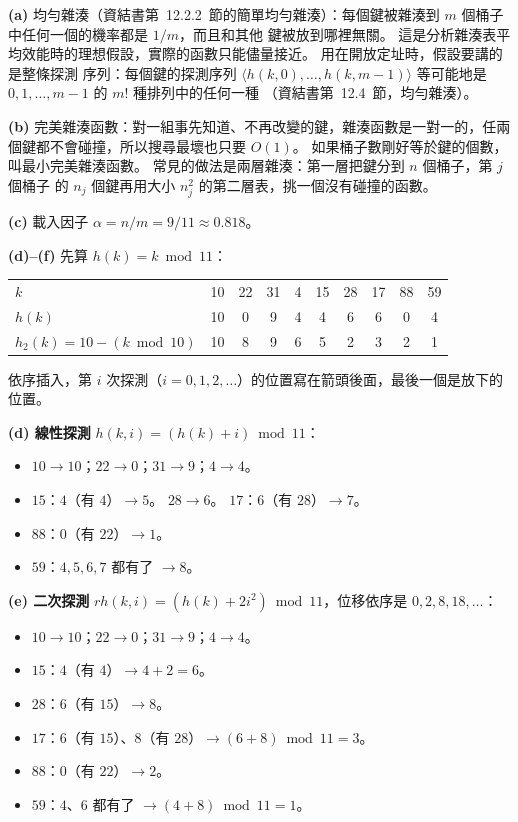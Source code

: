 \begin{pastsoln}
\textbf{(a)} 均勻雜湊（資結書第~12.2.2~節的簡單均勻雜湊）：每個鍵被雜湊到 $m$ 個桶子中任何一個的機率都是 $1/m$，而且和其他
鍵被放到哪裡無關。 這是分析雜湊表平均效能時的理想假設，實際的函數只能儘量接近。 用在開放定址時，假設要講的是整條探測
序列：每個鍵的探測序列 $\langle h(k,0), \ldots, h(k,m-1)\rangle$ 等可能地是 $0, 1, \ldots, m-1$ 的 $m!$ 種排列中的任何一種
（資結書第~12.4~節，均勻雜湊）。

\textbf{(b)} 完美雜湊函數：對一組事先知道、不再改變的鍵，雜湊函數是一對一的，任兩個鍵都不會碰撞，所以搜尋最壞也只要
$O(1)$。 如果桶子數剛好等於鍵的個數，叫最小完美雜湊函數。 常見的做法是兩層雜湊：第一層把鍵分到 $n$ 個桶子，第 $j$ 個桶子
的 $n_j$ 個鍵再用大小 $n_j^2$ 的第二層表，挑一個沒有碰撞的函數。

\textbf{(c)} 載入因子 $\alpha = n/m = 9/11 \approx 0.818$。

\textbf{(d)--(f)} 先算 $h(k) = k \bmod 11$：
\begin{center}
\small
\begin{tabular}{l*{9}{c}}
\toprule
$k$ & 10 & 22 & 31 & 4 & 15 & 28 & 17 & 88 & 59 \\
$h(k)$ & 10 & 0 & 9 & 4 & 4 & 6 & 6 & 0 & 4 \\
$h_2(k) = 10 - (k \bmod 10)$ & 10 & 8 & 9 & 6 & 5 & 2 & 3 & 2 & 1 \\
\bottomrule
\end{tabular}
\end{center}
依序插入，第 $i$ 次探測（$i = 0, 1, 2, \ldots$）的位置寫在箭頭後面，最後一個是放下的位置。

\textbf{(d) 線性探測} $h(k, i) = (h(k) + i) \bmod 11$：
\begin{itemize}
\item $10 \to 10$；$22 \to 0$；$31 \to 9$；$4 \to 4$。
\item $15$：$4$（有 $4$）$\to 5$。 $28 \to 6$。 $17$：$6$（有 $28$）$\to 7$。
\item $88$：$0$（有 $22$）$\to 1$。
\item $59$：$4, 5, 6, 7$ 都有了 $\to 8$。
\end{itemize}

\textbf{(e) 二次探測} $rh(k, i) = (h(k) + 2i^2) \bmod 11$，位移依序是 $0, 2, 8, 18, \ldots$：
\begin{itemize}
\item $10 \to 10$；$22 \to 0$；$31 \to 9$；$4 \to 4$。
\item $15$：$4$（有 $4$）$\to 4 + 2 = 6$。
\item $28$：$6$（有 $15$）$\to 8$。
\item $17$：$6$（有 $15$）、$8$（有 $28$）$\to (6 + 8) \bmod 11 = 3$。
\item $88$：$0$（有 $22$）$\to 2$。
\item $59$：$4$、$6$ 都有了 $\to (4 + 8) \bmod 11 = 1$。
\end{itemize}


\end{pastsoln}
